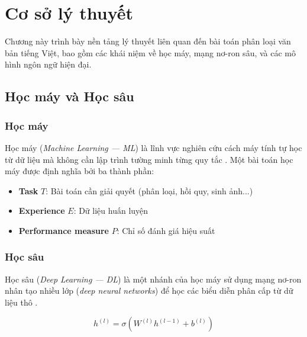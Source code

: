 \documentclass[12pt, a4paper]{report}
\begin{document}

\chapter{Cơ sở lý thuyết}
\label{chap:theory}

Chương này trình bày nền tảng lý thuyết liên quan đến bài toán phân loại
văn bản tiếng Việt, bao gồm các khái niệm về học máy, mạng nơ-ron sâu,
và các mô hình ngôn ngữ hiện đại.

\section{Học máy và Học sâu}
\label{sec:ml-dl}

\subsection{Học máy}

Học máy (\textit{Machine Learning --- ML}) là lĩnh vực nghiên cứu cách
máy tính tự học từ dữ liệu mà không cần lập trình tường minh từng quy tắc
\cite{Goodfellow2016}. Một bài toán học máy được định nghĩa bởi ba thành phần:

\begin{itemize}
  \item \textbf{Task} $T$: Bài toán cần giải quyết (phân loại, hồi quy, sinh ảnh...)
  \item \textbf{Experience} $E$: Dữ liệu huấn luyện
  \item \textbf{Performance measure} $P$: Chỉ số đánh giá hiệu suất
\end{itemize}

\subsection{Học sâu}

Học sâu (\textit{Deep Learning --- DL}) là một nhánh của học máy sử dụng
mạng nơ-ron nhân tạo nhiều lớp (\textit{deep neural networks}) để học
các biểu diễn phân cấp từ dữ liệu thô \cite{LeCun2015deep}.

\begin{equation}
  \label{eq:forward}
  h^{(l)} = \sigma\!\left(W^{(l)} h^{(l-1)} + b^{(l)}\right)
\end{equation}
\end{document}
